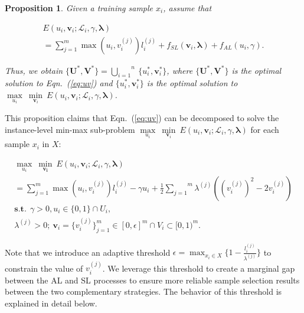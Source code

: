 \documentclass[journal]{IEEEtran}
\newtheorem{prop}{Proposition}
\begin{document}
{
\begin{prop}Given a training sample $x_i$, assume that 
	\begin{small}\begin{equation}\begin{gathered}
		E(u_i,\mathbf{v}_i;\mathcal{L}_i,\gamma, {\bm \lambda}) \\= \sum_{j=1}^{m}\max(u_i,v^{(j)}_i)l^{(j)}_i + f_{SL}(\mathbf{v}_i,{\bm \lambda})+ f_{AL}(u_i,\gamma).\label{eq5}
		\end{gathered}
		\end{equation}\end{small}
    Thus, we obtain $\{\mathbf{U}^\ast,\mathbf{V}^\ast\} = \overset{n}{\underset{i=1}{\bigcup}} \ \{u_i^\ast,\mathbf{v}^\ast_i\}$, where $\{\mathbf{U}^\ast,\mathbf{V}^\ast\}$ is the optimal solution to Eqn.~(\ref{eq:uv}) and $\{u^\ast_i,\mathbf{v}^\ast_i\}$ is the optimal solution to $\underset{u_i}{\max} \ \underset{\mathbf{v}_i}{\min} \  E(u_i,\mathbf{v}_i;\mathcal{L}_i,\gamma,{\bm \lambda})$.\end{prop} 
This proposition claims that Eqn.~(\ref{eq:uv}) can be decomposed to solve the instance-level min-max sub-problem $\underset{u_i}{\max} \ \underset{\mathbf{v}_i}{\min} \  E(u_i,\mathbf{v}_i;\mathcal{L}_i,\gamma,{\bm \lambda})$ for each sample $x_i$ in $X$: 
	\begin{small}\begin{equation}\begin{gathered}
		\underset{u_i}{\max} \ \underset{\mathbf{v_i}}{\min} \  E(u_i,\mathbf{v}_i;\mathcal{L}_{i},\gamma,{\bm \lambda}) \\= \sum_{j=1}^{m}\max(u_i,v_i^{(j)})l_i^{(j)} -\gamma u_i + \frac{1}{2}\overset{m}{\underset{j=1}{\sum}}\lambda^{(j)}((v_i^{(j)})^2-2v_i^{(j)}) \\ \mathbf{s.t.} \ \ \gamma > 0, u_i \in \{0,1\}\cap U_i, \\ \lambda^{(j)} > 0; \ \mathbf{v}_i=\{v_i^{(j)}\}^m_{j=1} \in [0,\epsilon]^m\cap V_i \subset [0,1)^m.
		\label{eq:uv2}\end{gathered}
		\end{equation}\end{small}Note that we introduce an adaptive threshold $\epsilon=\max_{x_i \in X} \{1 - \frac{l_i^{(j)}}{\lambda^{(j)}}\}$ to constrain the value of $v^{(j)}_i$. We leverage this threshold to create a marginal gap between the AL and SL processes to ensure more reliable sample selection results between the two complementary strategies. The behavior of this threshold is explained in detail below.  
}
\end{document}
